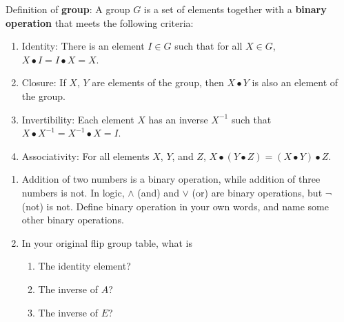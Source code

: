 \documentclass[../gatm.tex]{subfiles}
\begin{document}
Definition of \textbf{group}: A group $G$ is a set of elements together with a \textbf{binary operation} that meets the following criteria:
\begin{enumerate}[label=(\alph*)]
\item Identity: There is an element $I\in G$ such that for all $X\in G$, $X\bullet I = I\bullet X = X$.
\item Closure: If $X$, $Y$ are elements of the group, then $X\bullet Y$ is also an element of the group.
\item Invertibility: Each element $X$ has an inverse $X^{-1}$ such that $X\bullet X^{-1} = X^{-1}\bullet X = I$.
\item Associativity: For all elements $X$, $Y$, and $Z$, $X\bullet (Y\bullet Z) = (X\bullet Y) \bullet Z$.
\end{enumerate}
\begin{enumerate}
\setcounter{enumi}{\theenumLast}
\item Addition of two numbers is a binary operation, while addition of three numbers is not. In logic, $\land$ (and) and $\lor$ (or) are binary operations, but $\lnot$ (not) is not. Define binary operation in your own words, and name some other binary operations.
\item In your original flip group table, what is
\begin{enumerate}
\item The identity element?
\item The inverse of $A$?
\item The inverse of $E$?
\end{enumerate}
\end{enumerate}
\end{document}
